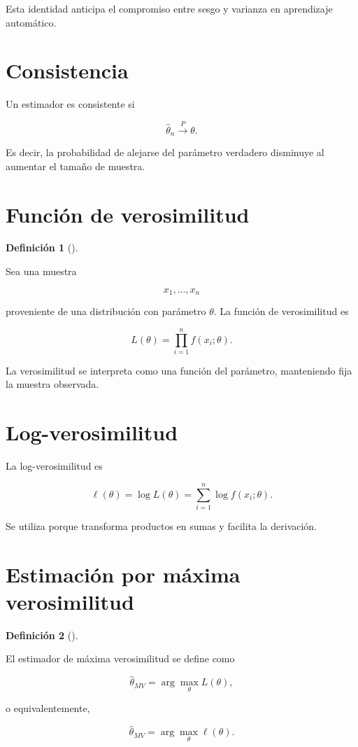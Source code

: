 \documentclass[
  spanish,
  11pt,
  letterpaper,
  DIV=11,
  numbers=noendperiod]{scrreprt}
\theoremstyle{definition}
\newtheorem{definition}{Definición}[chapter]
\theoremstyle{plain}
\theoremstyle{definition}
\theoremstyle{remark}
\begin{document}
Esta identidad anticipa el compromiso entre sesgo y varianza en
aprendizaje automático.

\section{Consistencia}\label{consistencia}

Un estimador es consistente si

\[
\widehat{\theta}_n
\overset{P}{\longrightarrow}
\theta.
\]

Es decir, la probabilidad de alejarse del parámetro verdadero disminuye
al aumentar el tamaño de muestra.

\section{Función de verosimilitud}\label{funciuxf3n-de-verosimilitud}

\begin{definition}[]\protect\hypertarget{def-verosimilitud}{}\label{def-verosimilitud}

Sea una muestra

\[
x_1,\ldots,x_n
\]

proveniente de una distribución con parámetro \(\theta\). La función de
verosimilitud es

\[
L(\theta)
=
\prod_{i=1}^{n}
f(x_i;\theta).
\]

\end{definition}

La verosimilitud se interpreta como una función del parámetro,
manteniendo fija la muestra observada.

\section{Log-verosimilitud}\label{log-verosimilitud}

La log-verosimilitud es

\[
\ell(\theta)
=
\log L(\theta)
=
\sum_{i=1}^{n}
\log f(x_i;\theta).
\]

Se utiliza porque transforma productos en sumas y facilita la
derivación.

\section{Estimación por máxima
verosimilitud}\label{estimaciuxf3n-por-muxe1xima-verosimilitud}

\begin{definition}[]\protect\hypertarget{def-maxima-verosimilitud}{}\label{def-maxima-verosimilitud}

El estimador de máxima verosimilitud se define como

\[
\widehat{\theta}_{MV}
=
\arg\max_{\theta}
L(\theta),
\]

o equivalentemente,

\[
\widehat{\theta}_{MV}
=
\arg\max_{\theta}
\ell(\theta).
\]

\end{definition}
\end{document}
